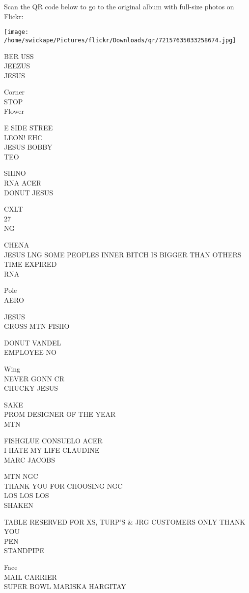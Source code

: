 \documentclass[10pt,letterpaper]{article}
\begin{document}
Scan the QR code below to go to the original album with full-size photos on Flickr:

\texttt{[image: /home/swickape/Pictures/flickr/Downloads/qr/72157635033258674.jpg]}


BER USS\\
JEEZUS\\
JESUS

Corner\\
STOP\\
Flower

E SIDE STREE\\
LEON! EHC\\
JESUS BOBBY\\
TEO

SHINO\\
RNA ACER\\
DONUT JESUS

CXLT\\
27\\
NG

CHENA\\
JESUS LNG SOME PEOPLES INNER BITCH IS BIGGER THAN OTHERS\\
TIME EXPIRED\\
RNA

Pole\\
AERO

JESUS\\
GROSS MTN FISHO

DONUT VANDEL\\
EMPLOYEE NO

Wing\\
NEVER GONN CR\\
CHUCKY JESUS

SAKE\\
PROM DESIGNER OF THE YEAR\\
MTN

FISHGLUE CONSUELO ACER\\
I HATE MY LIFE CLAUDINE\\
MARC JACOBS

MTN NGC\\
THANK YOU FOR CHOOSING NGC\\
LOS LOS LOS\\
SHAKEN

TABLE RESERVED FOR XS, TURP'S \& JRG CUSTOMERS ONLY THANK YOU\\
PEN\\
STANDPIPE

Face\\
MAIL CARRIER\\
SUPER BOWL MARISKA HARGITAY
\end{document}

